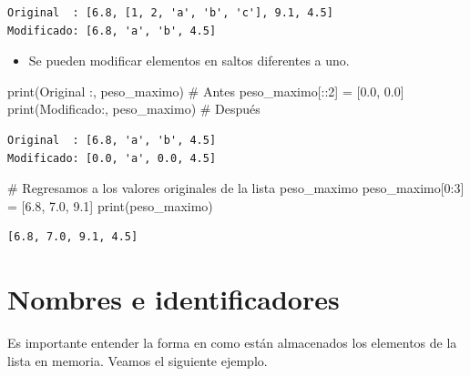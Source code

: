 \documentclass[
  spanish,
  letterpaper,
]{scrbook}
\newenvironment{Shaded}{\begin{snugshade}}{\end{snugshade}}
\newcommand{\BuiltInTok}[1]{\textcolor[rgb]{0.00,0.23,0.31}{#1}}
\newcommand{\CommentTok}[1]{\textcolor[rgb]{0.37,0.37,0.37}{#1}}
\newcommand{\DecValTok}[1]{\textcolor[rgb]{0.68,0.00,0.00}{#1}}
\newcommand{\FloatTok}[1]{\textcolor[rgb]{0.68,0.00,0.00}{#1}}
\newcommand{\NormalTok}[1]{\textcolor[rgb]{0.00,0.23,0.31}{#1}}
\newcommand{\OperatorTok}[1]{\textcolor[rgb]{0.37,0.37,0.37}{#1}}
\newcommand{\StringTok}[1]{\textcolor[rgb]{0.13,0.47,0.30}{#1}}
\providecommand{\tightlist}{%
  \setlength{\itemsep}{0pt}\setlength{\parskip}{0pt}}
\theoremstyle{definition}
\theoremstyle{remark}
\begin{document}
\begin{verbatim}
Original  : [6.8, [1, 2, 'a', 'b', 'c'], 9.1, 4.5]
Modificado: [6.8, 'a', 'b', 4.5]
\end{verbatim}

\begin{itemize}
\tightlist
\item
  Se pueden modificar elementos en saltos diferentes a uno.
\end{itemize}

\begin{Shaded}
\begin{Highlighting}[]
\BuiltInTok{print}\NormalTok{(}\StringTok{\textquotesingle{}Original  :\textquotesingle{}}\NormalTok{, peso\_maximo) }\CommentTok{\# Antes}
\NormalTok{peso\_maximo[::}\DecValTok{2}\NormalTok{] }\OperatorTok{=}\NormalTok{ [}\FloatTok{0.0}\NormalTok{, }\FloatTok{0.0}\NormalTok{] }
\BuiltInTok{print}\NormalTok{(}\StringTok{\textquotesingle{}Modificado:\textquotesingle{}}\NormalTok{, peso\_maximo) }\CommentTok{\# Después}
\end{Highlighting}
\end{Shaded}

\begin{verbatim}
Original  : [6.8, 'a', 'b', 4.5]
Modificado: [0.0, 'a', 0.0, 4.5]
\end{verbatim}

\begin{Shaded}
\begin{Highlighting}[]
\CommentTok{\# Regresamos a los valores originales de la lista peso\_maximo}
\NormalTok{peso\_maximo[}\DecValTok{0}\NormalTok{:}\DecValTok{3}\NormalTok{] }\OperatorTok{=}\NormalTok{ [}\FloatTok{6.8}\NormalTok{, }\FloatTok{7.0}\NormalTok{, }\FloatTok{9.1}\NormalTok{]}
\BuiltInTok{print}\NormalTok{(peso\_maximo)}
\end{Highlighting}
\end{Shaded}

\begin{verbatim}
[6.8, 7.0, 9.1, 4.5]
\end{verbatim}

\section{Nombres e identificadores}\label{nombres-e-identificadores}

Es importante entender la forma en como están almacenados los elementos
de la lista en memoria. Veamos el siguiente ejemplo.
\end{document}
